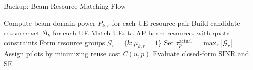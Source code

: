 \documentclass[aspectratio=169, 10pt]{beamer}
\newcommand{\methodBRM}{Beam-Resource Matching}
\newcommand{\tauactual}{\tau_p^{\mathrm{actual}}}
\begin{document}
\begin{frame}[label=app-brm-flow]{Backup: Beam-Resource Matching Flow}
    \begin{algorithm}[H]
        \DontPrintSemicolon
        Compute beam-domain power \(P_{k,r}\) for each UE-resource pair\;
        Build candidate resource set \(\mathcal{B}_k\) for each UE\;
        Match UEs to AP-beam resources with quota constraints\;
        Form resource groups \(\mathcal{G}_r=\{k:\mu_{k,r}=1\}\)\;
        Set \(\tauactual=\max_r|\mathcal{G}_r|\)\;
        Assign pilots by minimizing reuse cost \(C(u,p)\)\;
        Evaluate closed-form SINR and SE\;
        \caption{\methodBRM{} summary}
    \end{algorithm}

    \begin{flushright}
        \hyperlink{main-pilot-rule}{}
    \end{flushright}
\end{frame}
\end{document}
